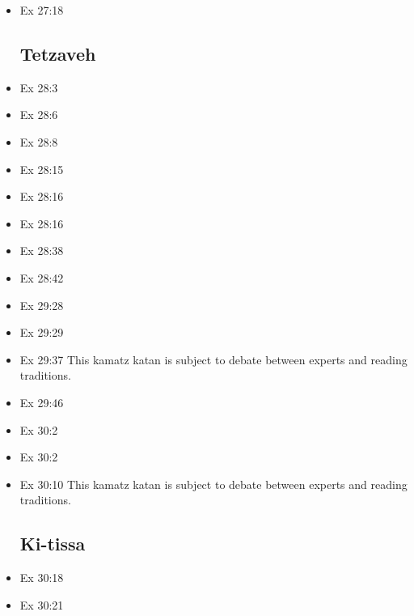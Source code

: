 \documentclass[14pt]{book}
\begin{document}
\begin{multicols}{2}
\begin{itemize}
\item Ex 27:18

\subsection{Tetzaveh}

\item Ex 28:3

\item Ex 28:6

\item Ex 28:8

\item Ex 28:15

\item Ex 28:16

\item Ex 28:16

\item Ex 28:38

\item Ex 28:42

\item Ex 29:28

\item Ex 29:29

\item Ex 29:37 This kamatz katan is subject to debate between experts and reading traditions.

\item Ex 29:46

\item Ex 30:2

\item Ex 30:2

\item Ex 30:10 This kamatz katan is subject to debate between experts and reading traditions.

\subsection{Ki-tissa}

\item Ex 30:18

\item Ex 30:21


\end{itemize}
\end{multicols}
\end{document}
